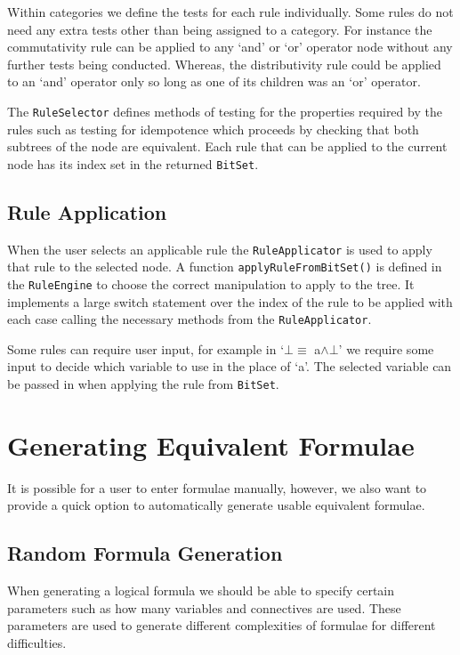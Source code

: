 \documentclass{report}
\begin{document}
Within categories we define the tests for each rule individually. Some rules do not need any extra tests other than being assigned to a category. For instance the commutativity rule can be applied to any `and' or `or' operator node without any further tests being conducted. Whereas, the distributivity rule could be applied to an `and' operator only so long as one of its children was an `or' operator.

The {\tt RuleSelector} defines methods of testing for the properties required by the rules such as testing for idempotence which proceeds by checking that both subtrees of the node are equivalent. Each rule that can be applied to the current node has its index set in the returned {\tt BitSet}.

\subsection{Rule Application}
\label{sub:rule_application}

When the user selects an applicable rule the {\tt RuleApplicator} is used to apply that rule to the selected node. A function {\tt applyRuleFromBitSet()} is defined in the {\tt RuleEngine} to choose the correct manipulation to apply to the tree. It implements a large switch statement over the index of the rule to be applied with each case calling the necessary methods from the {\tt RuleApplicator}.

Some rules can require user input, for example in `$\bot \equiv$ a$\land\bot$' we require some input to decide which variable to use in the place of `a'. The selected variable can be passed in when applying the rule from {\tt BitSet}.

\section{Generating Equivalent Formulae}
\label{sec:generating_equivalent_formulae}

It is possible for a user to enter formulae manually, however, we also want to provide a quick option to automatically generate usable equivalent formulae.

\subsection{Random Formula Generation}
\label{sub:random_formula_generation}

When generating a logical formula we should be able to specify certain parameters such as how many variables and connectives are used. These parameters are used to generate different complexities of formulae for different difficulties.
\end{document}
